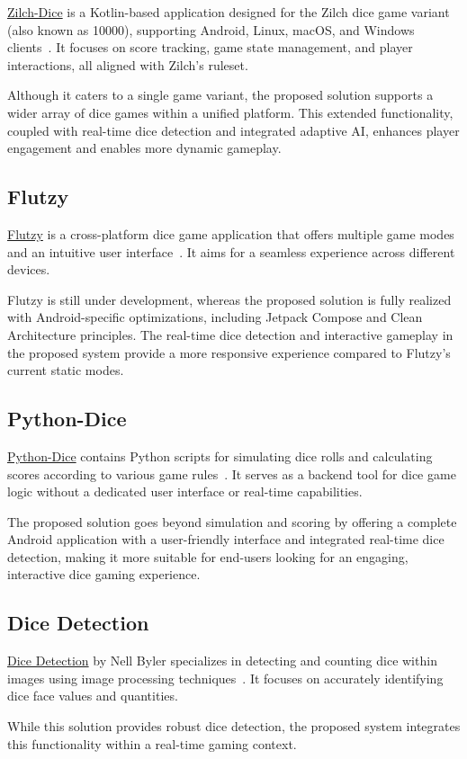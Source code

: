 \href{https://github.com/pandulapeter/zilch-dice}{Zilch-Dice} is a Kotlin-based application designed for the Zilch dice game variant (also known as 10000), supporting Android, Linux, macOS, and Windows clients~\cite{bib:zilchdice}. It focuses on score tracking, game state management, and player interactions, all aligned with Zilch’s ruleset.

Although it caters to a single game variant, the proposed solution supports a wider array of dice games within a unified platform. This extended functionality, coupled with real-time dice detection and integrated adaptive AI, enhances player engagement and enables more dynamic gameplay.

\subsection{Flutzy}

\href{https://github.com/amuhaimin02/flutzy}{Flutzy} is a cross-platform dice game application that offers multiple game modes and an intuitive user interface~\cite{bib:flutzy}. It aims for a seamless experience across different devices.

Flutzy is still under development, whereas the proposed solution is fully realized with Android-specific optimizations, including Jetpack Compose and Clean Architecture principles. The real-time dice detection and interactive gameplay in the proposed system provide a more responsive experience compared to Flutzy’s current static modes.

\subsection{Python-Dice}

\href{https://github.com/jckuhl/Python-Dice}{Python-Dice} contains Python scripts for simulating dice rolls and calculating scores according to various game rules~\cite{bib:python-dice}. It serves as a backend tool for dice game logic without a dedicated user interface or real-time capabilities.

The proposed solution goes beyond simulation and scoring by offering a complete Android application with a user-friendly interface and integrated real-time dice detection, making it more suitable for end-users looking for an engaging, interactive dice gaming experience.

\subsection{Dice Detection}

\href{https://github.com/binaryshrey/Dice}{Dice Detection} by Nell Byler specializes in detecting and counting dice within images using image processing techniques~\cite{bib:nell-byler}. It focuses on accurately identifying dice face values and quantities.

While this solution provides robust dice detection, the proposed system integrates this functionality within a real-time gaming context.
